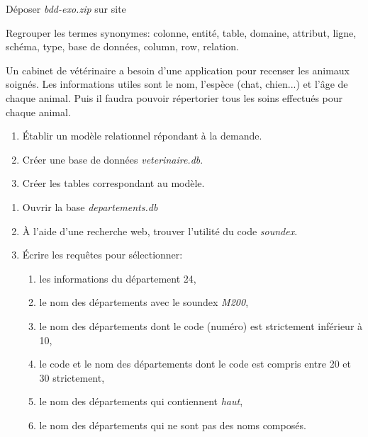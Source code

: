 \documentclass[a4paper,11pt]{article}
\begin{document}
\begin{Form}
\begin{commentprof}
Déposer \emph{bdd-exo.zip} sur site
\end{commentprof}

\begin{exo}
Regrouper les termes synonymes: colonne, entité, table, domaine, attribut, ligne, schéma, type, base de données, column, row, relation.
\end{exo}
\begin{exo}
Un cabinet de vétérinaire a besoin d'une application pour recenser les animaux soignés. Les informations utiles sont le nom, l'espèce (chat, chien...) et l'âge de chaque animal. Puis il faudra pouvoir répertorier tous les soins effectués pour chaque animal.
\begin{enumerate}
\item Établir un modèle relationnel répondant à la demande.
\item Créer une base de données \emph{veterinaire.db}.
\item Créer les tables correspondant au modèle.
\end{enumerate}
\end{exo}
\begin{center}
\end{center}
\begin{exo}
\begin{enumerate}
\item Ouvrir la base \emph{departements.db}
\item À l'aide d'une recherche web, trouver l'utilité du code \emph{soundex}.
\item Écrire les requêtes pour sélectionner:
\begin{enumerate}
\item les informations du département 24,
\item le nom des départements avec le soundex \emph{M200},
\item le nom des départements dont le code (numéro) est strictement inférieur à 10,
\item le code et le nom des départements dont le code est compris entre 20 et 30 strictement,
\item le nom des départements qui contiennent \emph{haut},
\item le nom des départements qui ne sont pas des noms composés.

\end{enumerate}
\end{enumerate}
\end{exo}
\end{Form}
\end{document}
